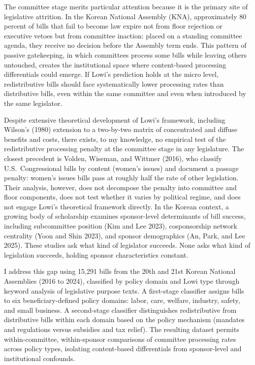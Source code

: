 \documentclass[11pt]{article}
\begin{document}
The committee stage merits particular attention because it is the primary site of legislative attrition. In the Korean National Assembly (KNA), approximately 80 percent of bills that fail to become law expire not from floor rejection or executive vetoes but from committee inaction: placed on a standing committee agenda, they receive no decision before the Assembly term ends. This pattern of passive gatekeeping, in which committees process some bills while leaving others untouched, creates the institutional space where content-based processing differentials could emerge. If Lowi's prediction holds at the micro level, redistributive bills should face systematically lower processing rates than distributive bills, even within the same committee and even when introduced by the same legislator.

Despite extensive theoretical development of Lowi's framework, including Wilson's (1980) extension to a two-by-two matrix of concentrated and diffuse benefits and costs, there exists, to my knowledge, no empirical test of the redistributive processing penalty at the committee stage in any legislature. The closest precedent is Volden, Wiseman, and Wittmer (2016), who classify U.S.\ Congressional bills by content (women's issues) and document a passage penalty: women's issues bills pass at roughly half the rate of other legislation. Their analysis, however, does not decompose the penalty into committee and floor components, does not test whether it varies by political regime, and does not engage Lowi's theoretical framework directly. In the Korean context, a growing body of scholarship examines sponsor-level determinants of bill success, including subcommittee position (Kim and Lee 2023), cosponsorship network centrality (Yoon and Shin 2023), and sponsor demographics (An, Park, and Lee 2025). These studies ask what kind of legislator succeeds. None asks what kind of legislation succeeds, holding sponsor characteristics constant.

I address this gap using 15,291 bills from the 20th and 21st Korean National Assemblies (2016 to 2024), classified by policy domain and Lowi type through keyword analysis of legislative purpose texts. A first-stage classifier assigns bills to six beneficiary-defined policy domains: labor, care, welfare, industry, safety, and small business. A second-stage classifier distinguishes redistributive from distributive bills within each domain based on the policy mechanism (mandates and regulations versus subsidies and tax relief). The resulting dataset permits within-committee, within-sponsor comparisons of committee processing rates across policy types, isolating content-based differentials from sponsor-level and institutional confounds.
\end{document}
